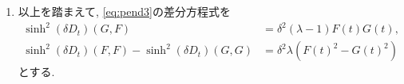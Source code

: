 \documentclass[a4paper]{ujarticle}
\numberwithin{equation}{section}
\theoremstyle{definition}
\begin{document}
\begin{enumerate}
        操作後の式は
        \begin{equation}
            \begin{aligned}
                \frac{1}{\delta^2} \sinh^2(\delta D_{t})(G, F) &= (\lambda - 1) F(t) G(t), \\
                \frac{1}{\delta^2} \sinh^2(\delta D_{t})(F, F) -  \frac{1}{\delta^2} \sinh^2(\delta D_{t})(G, G) &= \lambda (F(t)^2 - G(t)^2)
            \end{aligned}
        \end{equation}
        と表示でき, $\delta \rightarrow 0$の極限で確かに\eqref{eq:pend3}と一致している.

        \item 以上を踏まえて, \eqref{eq:pend3}の差分方程式を
        \begin{equation} \label{eq:sabun1}
            \begin{aligned}
                \sinh^2(\delta D_{t})(G, F) &= \delta^2 (\lambda - 1) F(t) G(t), \\
                \sinh^2(\delta D_{t})(F, F) - \sinh^2(\delta D_{t})(G, G) &= \delta^2 \lambda (F(t)^2 - G(t)^2)
            \end{aligned}
        \end{equation}
        とする.


\end{enumerate}
\end{document}
